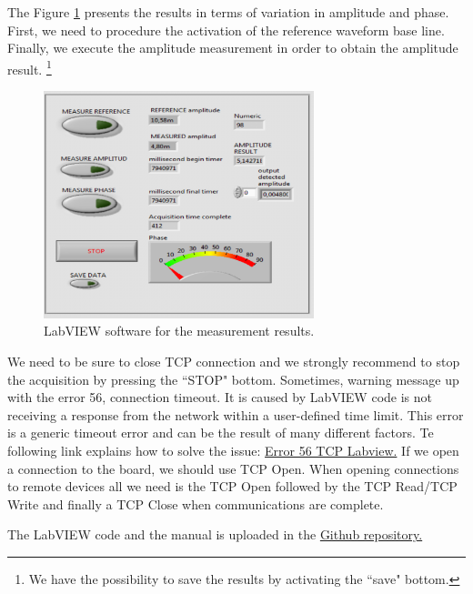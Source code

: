 \documentclass[12pt]{extarticle}
\begin{document}
The Figure \ref{fig:labview2} presents the results in terms of variation in amplitude and phase. First, we need to procedure the activation of the reference waveform base line.  Finally, we execute the amplitude measurement in order to obtain the amplitude result. \footnote{We have the possibility to save the results by activating the ``save" bottom.}

\begin{figure}[!h]
	\begin{center}
		\includegraphics[width=0.7\textwidth]{images2/labview2} 
		\caption{LabVIEW software for the measurement results.}
		\label{fig:labview2}
	\end{center}
\end{figure}



We need to be sure to close TCP connection and we strongly recommend to stop the acquisition by pressing the ``STOP" bottom.  Sometimes, warning message up with the error 56, connection timeout. It is caused by LabVIEW code is not receiving a response from the network within a user-defined time limit. This error is a generic timeout error and can be the result of many different factors. Te following link explains how to solve the issue: \href{https://knowledge.ni.com/KnowledgeArticleDetails?id=kA00Z0000019Lz2SAE&l=es-ES}{Error 56 TCP Labview.}
If we open a connection to the board, we should use TCP Open. When opening connections to remote devices all we need is the TCP Open followed by the TCP Read/TCP Write and finally a TCP Close when communications are complete. 

The LabVIEW code and the manual is uploaded in the
\href{https://github.com/charlicruz/coil_measurements}{Github repository.}





\end{document}
